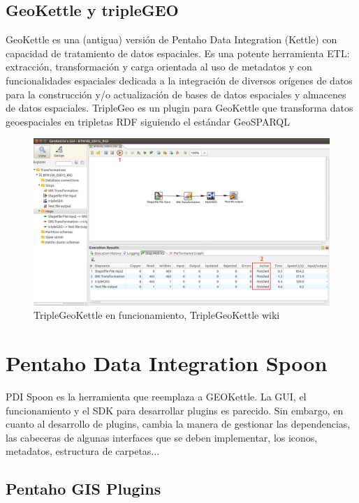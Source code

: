 \subsection{GeoKettle y tripleGEO}

GeoKettle es una (antigua) versión de Pentaho Data Integration (Kettle)\cite{pentaho} con capacidad de tratamiento de datos
espaciales. Es una potente herramienta ETL: extracción, transformación y carga orientada al uso de metadatos y
con funcionalidades espaciales dedicada a la integración de diversos orígenes de datos para la construcción y/o
actualización de bases de datos espaciales y almacenes de datos espaciales. \cite{geokettle-osg}
TripleGeo es un plugin para GeoKettle que transforma datos geoespaciales en tripletas RDF siguiendo el estándar
GeoSPARQL \cite{triplegeo}

\begin{figure}[H]
    \includegraphics[width=\textwidth]{images/kettle.png}
    \centering
    \caption{TripleGeoKettle en funcionamiento, TripleGeoKettle wiki}
    \label{fig:kettle}
\end{figure}

\section{Pentaho Data Integration Spoon}

PDI Spoon\cite{pdi-spoon} es la herramienta que reemplaza a GEOKettle. La GUI, el funcionamiento y el SDK para desarrollar
plugins es parecido. Sin embargo, en cuanto al desarrollo de plugins, cambia la manera de gestionar las
dependencias, las cabeceras de algunas interfaces que se deben implementar, los iconos, metadatos, estructura de
carpetas...

\subsection{Pentaho GIS Plugins}

